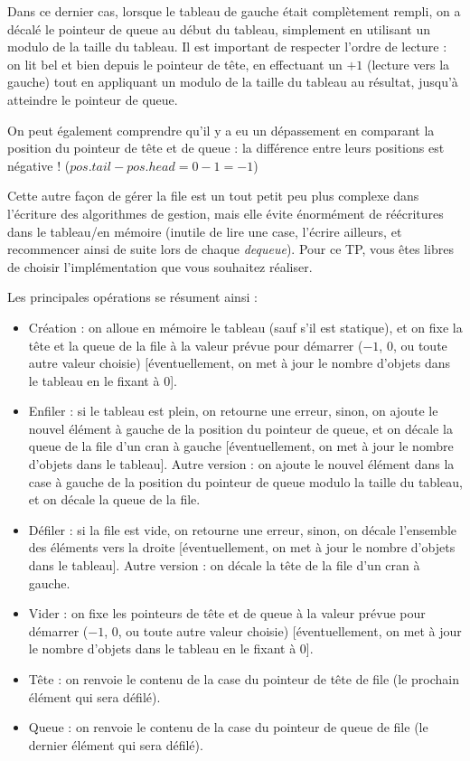 \smallskip

Dans ce dernier cas, lorsque le tableau de gauche était complètement rempli, on a décalé le pointeur de queue au début du tableau, simplement en utilisant un modulo de la taille du tableau.
Il est important de respecter l'ordre de lecture : on lit bel et bien depuis le pointeur de tête, en effectuant un $ +1 $ (lecture vers la gauche) tout en appliquant un modulo de la taille du tableau au résultat, jusqu'à atteindre le pointeur de queue.

On peut également comprendre qu'il y a eu un dépassement en comparant la position du pointeur de tête et de queue : la différence entre leurs positions est négative ! \linebreak
($ pos. tail - pos. head = 0 - 1 = -1$)

\bigskip

Cette autre façon de gérer la file est un tout petit peu plus complexe dans l'écriture des algorithmes de gestion, mais elle évite énormément de réécritures dans le tableau/en mémoire (inutile de lire une case, l'écrire ailleurs, et recommencer ainsi de suite lors de chaque \textit{dequeue}).
Pour ce TP, vous êtes libres de choisir l'implémentation que vous souhaitez réaliser.

\bigskip

Les principales opérations se résument ainsi :
\begin{itemize}
\item Création : on alloue en mémoire le tableau (sauf s'il est statique), et on fixe la tête et la queue de la file à la valeur prévue pour démarrer ($ -1 $, $ 0 $, ou toute autre valeur choisie) [éventuellement, on met à jour le nombre d'objets dans le tableau en le fixant à $ 0 $].
\item Enfiler : si le tableau est plein, on retourne une erreur, sinon, on ajoute le nouvel élément à gauche de la position du pointeur de queue, et on décale la queue de la file d'un cran à gauche [éventuellement, on met à jour le nombre d'objets dans le tableau].
Autre version : on ajoute le nouvel élément dans la case à gauche de la position du pointeur de queue modulo la taille du tableau, et on décale la queue de la file.
\item Défiler : si la file est vide, on retourne une erreur, sinon, on décale l'ensemble des éléments vers la droite [éventuellement, on met à jour le nombre d'objets dans le tableau].
Autre version : on décale la tête de la file d'un cran à gauche.
\item Vider : on fixe les pointeurs de tête et de queue à la valeur prévue pour démarrer ($ -1 $, $ 0 $, ou toute autre valeur choisie) [éventuellement, on met à jour le nombre d'objets dans le tableau en le fixant à $ 0 $].
\item Tête : on renvoie le contenu de la case du pointeur de tête de file (le prochain élément qui sera défilé).
\item Queue : on renvoie le contenu de la case du pointeur de queue de file (le dernier élément qui sera défilé).
\end{itemize}

\setlength{\parindent}{\defaultparindent}
